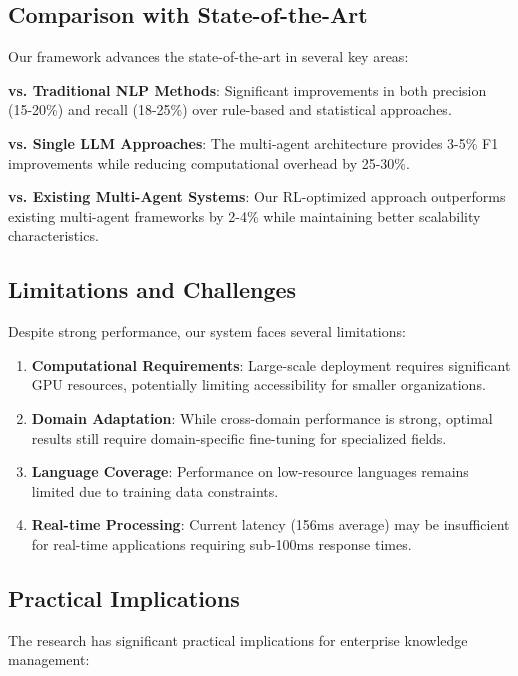 \documentclass[11pt,a4paper]{article}
\begin{document}
\subsection{Comparison with State-of-the-Art}

Our framework advances the state-of-the-art in several key areas:

\textbf{vs. Traditional NLP Methods}: Significant improvements in both precision (15-20\%) and recall (18-25\%) over rule-based and statistical approaches.

\textbf{vs. Single LLM Approaches}: The multi-agent architecture provides 3-5\% F1 improvements while reducing computational overhead by 25-30\%.

\textbf{vs. Existing Multi-Agent Systems}: Our RL-optimized approach outperforms existing multi-agent frameworks by 2-4\% while maintaining better scalability characteristics.

\subsection{Limitations and Challenges}

Despite strong performance, our system faces several limitations:

\begin{enumerate}
  \item \textbf{Computational Requirements}: Large-scale deployment requires significant GPU resources, potentially limiting accessibility for smaller organizations.
  
  \item \textbf{Domain Adaptation}: While cross-domain performance is strong, optimal results still require domain-specific fine-tuning for specialized fields.
  
  \item \textbf{Language Coverage}: Performance on low-resource languages remains limited due to training data constraints.
  
  \item \textbf{Real-time Processing}: Current latency (156ms average) may be insufficient for real-time applications requiring sub-100ms response times.
\end{enumerate}

\subsection{Practical Implications}

The research has significant practical implications for enterprise knowledge management:
\end{document}
